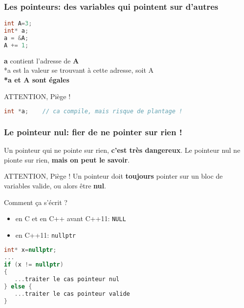 \documentclass{beamer}
\begin{document}
\begin{frame}[fragile=singleslide,shrink=20]
\frametitle{Les pointeurs: des variables qui pointent sur d'autres}

\begin{lstlisting}[language=c++]
int A=3;
int* a;
a = &A;
A += 1;
\end{lstlisting}

\textbf{a} contient l'adresse de \textbf{A} \\
*a est la valeur se trouvant à cette adresse, soit A \\
\textbf{*a et A sont égales}

\begin{block}{ATTENTION, Piège !}
\begin{lstlisting}[language=c++]
int *a;    // ca compile, mais risque de plantage !
\end{lstlisting}
\end{block}
\end{frame}

\begin{frame}[fragile=singleslide,shrink=20]
\frametitle{Le pointeur nul: fier de ne pointer sur rien !}

Un pointeur qui ne pointe sur rien, \textbf{c'est très dangereux}.
Le pointeur nul ne pionte sur rien, \textbf{mais on peut le savoir}.

\begin{block}{ATTENTION, Piège !}
Un pointeur doit \textbf{toujours} pointer sur un bloc de variables valide, ou alors être \textbf{nul}.
\end{block}


Comment ça s'écrit ?
\begin{itemize}
\item{en C et en C++ avant C++11: \texttt{NULL}}
\item{en C++11: \texttt{nullptr}}
\end{itemize}

\begin{lstlisting}[language=c++]
int* x=nullptr;
...
if (x != nullptr)
{
   ...traiter le cas pointeur nul
} else {
   ...traiter le cas pointeur valide
}
\end{lstlisting}

\end{frame}
\end{document}
